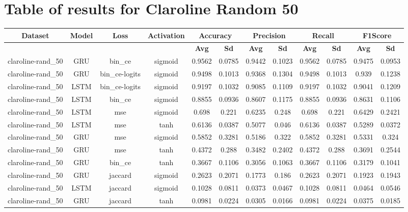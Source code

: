 \documentclass{article}%
\begin{document}
\section{Table of results for Claroline Random 50}%
\label{sec:TableofresultsforClarolineRandom50}%
\begin{tabular}{|c|c|c|c|c|c|c|c|c|c|c|c|}%
\hline%
\rowcolor{lightgray!70}%
\textbf{Dataset}&\textbf{Model}&\textbf{Loss}&\textbf{Activation}&\multicolumn{2}{c|}{\textbf{Accuracy}}&\multicolumn{2}{c|}{\textbf{Precision}}&\multicolumn{2}{c|}{\textbf{Recall}}&\multicolumn{2}{c|}{\textbf{F1Score}}\\%
\hline%
\rowcolor{lightgray!70}%
\textbf{}&\textbf{}&\textbf{}&\textbf{}&\textbf{Avg}&\textbf{Sd}&\textbf{Avg}&\textbf{Sd}&\textbf{Avg}&\textbf{Sd}&\textbf{Avg}&\textbf{Sd}\\%
\hline%
claroline{-}rand\_50&GRU&bin\_ce&sigmoid&0.9562&0.0785&0.9442&0.1023&0.9562&0.0785&0.9475&0.0953\\%
\hline%
claroline{-}rand\_50&GRU&bin\_ce{-}logits&sigmoid&0.9498&0.1013&0.9368&0.1304&0.9498&0.1013&0.939&0.1238\\%
\hline%
claroline{-}rand\_50&LSTM&bin\_ce{-}logits&sigmoid&0.9197&0.1032&0.9085&0.1109&0.9197&0.1032&0.9041&0.1209\\%
\hline%
claroline{-}rand\_50&LSTM&bin\_ce&sigmoid&0.8855&0.0936&0.8607&0.1175&0.8855&0.0936&0.8631&0.1106\\%
\hline%
claroline{-}rand\_50&LSTM&mse&sigmoid&0.698&0.221&0.6235&0.248&0.698&0.221&0.6429&0.2421\\%
\hline%
claroline{-}rand\_50&LSTM&mse&tanh&0.6136&0.0387&0.5077&0.046&0.6136&0.0387&0.5289&0.0372\\%
\hline%
claroline{-}rand\_50&GRU&mse&sigmoid&0.5852&0.3281&0.5186&0.322&0.5852&0.3281&0.5331&0.324\\%
\hline%
claroline{-}rand\_50&GRU&mse&tanh&0.4372&0.288&0.3482&0.2402&0.4372&0.288&0.3691&0.2544\\%
\hline%
claroline{-}rand\_50&GRU&bin\_ce&tanh&0.3667&0.1106&0.3056&0.1063&0.3667&0.1106&0.3179&0.1041\\%
\hline%
claroline{-}rand\_50&GRU&jaccard&sigmoid&0.2623&0.2071&0.1773&0.186&0.2623&0.2071&0.1923&0.1943\\%
\hline%
claroline{-}rand\_50&LSTM&jaccard&sigmoid&0.1028&0.0811&0.0373&0.0467&0.1028&0.0811&0.0464&0.0546\\%
\hline%
claroline{-}rand\_50&GRU&jaccard&tanh&0.0981&0.0224&0.0305&0.0166&0.0981&0.0224&0.0375&0.0185\\%

\end{tabular}
\end{document}

